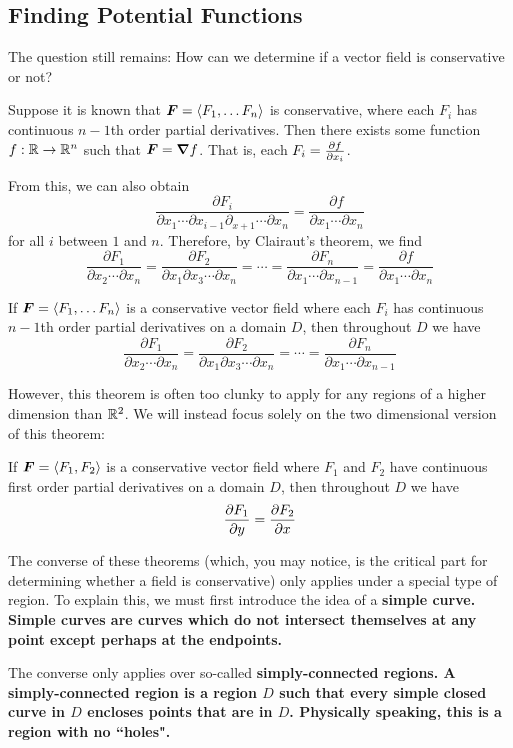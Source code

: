 \subsection{Finding Potential Functions}
The question still remains: How can we determine if a vector field is conservative or not? \par
Suppose it is known that $\boldsymbol{F} = \left\langle F_1, \dots F_n\right\rangle$ is conservative, where each $F_i$ has continuous $n-1$th order partial derivatives. Then there exists some function $f: \mathbb{R}\to\mathbb{R}^n$ such that $\boldsymbol{F} = \boldsymbol\nabla f$. That is, each $F_i = \pdv{f}{x_i}$. \par
From this, we can also obtain
\[ \frac{\partial F_i}{\partial x_1\cdots \partial x_{i-1}\partial_{x+1}\cdots\partial x_n} = \frac{\partial f}{\partial x_1\cdots \partial x_n}\]
for all $i$ between $1$ and $n$. Therefore, by Clairaut's theorem, we find
\[ \frac{\partial F_1}{\partial x_2\cdots\partial x_n} = \frac{\partial F_2}{\partial x_1\partial x_3\cdots\partial x_n} = \cdots = \frac{\partial F_n}{\partial x_1\cdots\partial x_{n-1}} = \frac{\partial f}{\partial x_1\cdots\partial x_n}\]
\begin{theorem}
    If $\boldsymbol{F} = \left\langle F_1, \dots F_n\right\rangle$ is a conservative vector field where each $F_i$ has continuous $n-1$th order partial derivatives on a domain $D$, then throughout $D$ we have
    \[ \frac{\partial F_1}{\partial x_2\cdots\partial x_n} = \frac{\partial F_2}{\partial x_1\partial x_3\cdots\partial x_n} = \cdots = \frac{\partial F_n}{\partial x_1\cdots\partial x_{n-1}} \]
\end{theorem}
However, this theorem is often too clunky to apply for any regions of a higher dimension than $\mathbb{R}^2$. We will instead focus solely on the two dimensional version of this theorem:
\begin{theorem}
     If $\boldsymbol{F} = \left\langle F_1, F_2\right\rangle$ is a conservative vector field where $F_1$ and $F_2$ have continuous first order partial derivatives on a domain $D$, then throughout $D$ we have
    \[ \pdv{F_1}{y} = \pdv{F_2}{x} \]
\end{theorem}
The converse of these theorems (which, you may notice, is the critical part for determining whether a field is conservative) only applies under a special type of region. To explain this, we must first introduce the idea of a \bf{simple curve}. Simple curves are curves which do not intersect themselves at any point except perhaps at the endpoints. \par
The converse only applies over so-called \bf{simply-connected regions}. A simply-connected region is a region $D$ such that every simple closed curve in $D$ encloses points that are in $D$. Physically speaking, this is a region with no ``holes". \par
